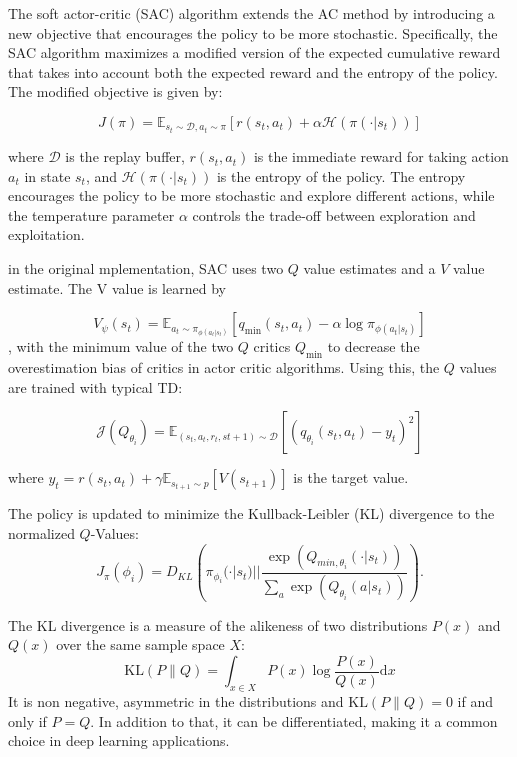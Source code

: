 The soft actor-critic (SAC) algorithm extends the AC method by introducing a new objective that encourages the policy to be more stochastic. Specifically, the SAC algorithm maximizes a modified 
version of the expected cumulative reward that takes into account both the expected reward and the entropy of the policy. The modified objective is given by:

\begin{equation}
J(\pi) = \mathbb{E}_{s_t \sim \mathcal{D}, a_t \sim \pi}[r(s_t, a_t) + \alpha \mathcal{H}(\pi(\cdot|s_t))]
\end{equation}

where $\mathcal{D}$ is the replay buffer, $r(s_t, a_t)$ is the immediate reward for taking action $a_t$ in state $s_t$, and $\mathcal{H}(\pi(\cdot|s_t))$ is the entropy of the policy. The entropy 
encourages the policy to be more stochastic and explore different actions, while the temperature parameter $\alpha$ controls the trade-off between exploration and exploitation.

in the original mplementation, SAC uses two $Q$ value estimates and a $V$ value estimate. The V value is learned by 

\begin{equation}
    V_{\psi}(s_t) = \mathbb{E}_{a_t \sim \pi_{\phi(a_t|s_t)}}[q_\text{min}(s_t, a_t) - \alpha \log \pi_{\phi(a_t|s_t)}]
\end{equation}
, with the minimum value of the two $Q$ critics $Q_\text{min}$ to decrease the overestimation bias of critics in actor critic algorithms. 
Using this, the $Q$ values are trained with typical TD:

\begin{equation}
    \mathcal{J}(Q_{\theta_i}) = \mathbb{E}_{(s_t, a_t, r_t, s{t+1}) \sim \mathcal{D}}[(q_{\theta_i}(s_t,a_t) - y_t)^2]
\end{equation}

where $y_t = r(s_t, a_t) + \gamma \mathbb{E}_{s_{t+1} \sim p}[V(s_{t+1})]$ is the target value. 

The policy is updated to minimize the Kullback-Leibler (KL) divergence to the normalized $Q$-Values:
\begin{equation}
    \label{sac_pol_obj}
    J_\pi(\phi_{i}) = D_{KL} \left( \pi_{\phi_{i}}(\cdot|s_t) || \frac{\exp(Q_{min, {\theta_i}}(\cdot|s_t))}{\underset{a}{\sum}  \exp(Q_{\theta_i}(a|s_t))} \right).
\end{equation}

The KL divergence is a measure of the alikeness of two distributions $P(x)$ and $Q(x)$ over the same sample space $X$:
\begin{equation}
    \label{KL}
    \mathrm{KL}(P\|Q) = \int_{x\in X} P(x) \log \frac{P(x)}{Q(x)} \mathrm{d}x
\end{equation}
It is non negative, asymmetric in the distributions and $\mathrm{KL}(P\|Q) = 0$ if and only if $P = Q$. In addition to that, it can be differentiated, making it 
a common choice in deep learning applications.\\

